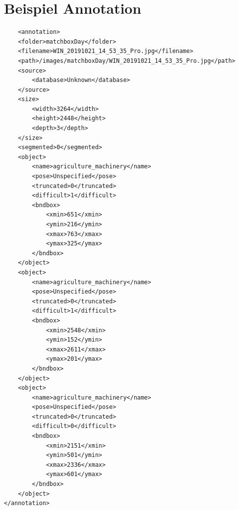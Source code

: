 \section{Beispiel Annotation}
\label{ap:annotation}
\begin{verbatim}
    <annotation>
	<folder>matchboxDay</folder>
	<filename>WIN_20191021_14_53_35_Pro.jpg</filename>
	<path>/images/matchboxDay/WIN_20191021_14_53_35_Pro.jpg</path>
	<source>
		<database>Unknown</database>
	</source>
	<size>
		<width>3264</width>
		<height>2448</height>
		<depth>3</depth>
	</size>
	<segmented>0</segmented>
	<object>
		<name>agriculture_machinery</name>
		<pose>Unspecified</pose>
		<truncated>0</truncated>
		<difficult>1</difficult>
		<bndbox>
			<xmin>651</xmin>
			<ymin>216</ymin>
			<xmax>763</xmax>
			<ymax>325</ymax>
		</bndbox>
	</object>
	<object>
		<name>agriculture_machinery</name>
		<pose>Unspecified</pose>
		<truncated>0</truncated>
		<difficult>1</difficult>
		<bndbox>
			<xmin>2548</xmin>
			<ymin>152</ymin>
			<xmax>2611</xmax>
			<ymax>201</ymax>
		</bndbox>
	</object>
	<object>
		<name>agriculture_machinery</name>
		<pose>Unspecified</pose>
		<truncated>0</truncated>
		<difficult>0</difficult>
		<bndbox>
			<xmin>2151</xmin>
			<ymin>501</ymin>
			<xmax>2336</xmax>
			<ymax>601</ymax>
		</bndbox>
	</object>
</annotation>
\end{verbatim}